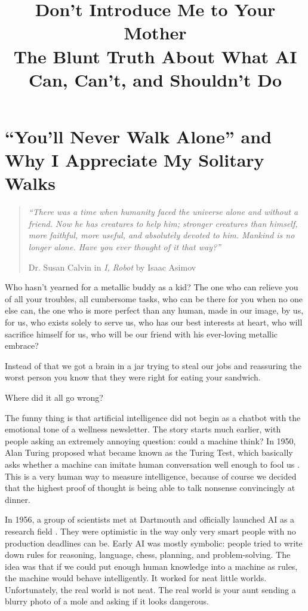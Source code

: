 \documentclass[12pt,oneside]{book}
\title{Don't Introduce Me to Your Mother\\\large The Blunt Truth About What AI Can, Can't, and Shouldn't Do}
\author{}
\date{}
\begin{document}
\hypersetup{pageanchor=false}
\frontmatter
\maketitle
\clearpage
\hypersetup{pageanchor=true}
\tableofcontents

\mainmatter

\chapter{``You'll Never Walk Alone'' and Why I Appreciate My Solitary Walks}

\begin{quote}
\itshape
``There was a time when humanity faced the universe alone and without a friend. Now he has creatures to help him; stronger creatures than himself, more faithful, more useful, and absolutely devoted to him. Mankind is no longer alone. Have you ever thought of it that way?''

\normalfont Dr. Susan Calvin in \emph{I, Robot} by Isaac Asimov \parencite{asimov1950}
\end{quote}

Who hasn't yearned for a metallic buddy as a kid? The one who can relieve you of all your troubles, all cumbersome tasks, who can be there for you when no one else can, the one who is more perfect than any human, made in our image, by us, for us, who exists solely to serve us, who has our best interests at heart, who will sacrifice himself for us, who will be our friend with his ever-loving metallic embrace?

Instead of that we got a brain in a jar trying to steal our jobs and reassuring the worst person you know that they were right for eating your sandwich.

Where did it all go wrong?

The funny thing is that artificial intelligence did not begin as a chatbot with the emotional tone of a wellness newsletter. The story starts much earlier, with people asking an extremely annoying question: could a machine think? In 1950, Alan Turing proposed what became known as the Turing Test, which basically asks whether a machine can imitate human conversation well enough to fool us \parencite{turing1950}. This is a very human way to measure intelligence, because of course we decided that the highest proof of thought is being able to talk nonsense convincingly at dinner.

In 1956, a group of scientists met at Dartmouth and officially launched AI as a research field \parencite{mccarthy1955}. They were optimistic in the way only very smart people with no production deadlines can be. Early AI was mostly symbolic: people tried to write down rules for reasoning, language, chess, planning, and problem-solving. The idea was that if we could put enough human knowledge into a machine as rules, the machine would behave intelligently. It worked for neat little worlds. Unfortunately, the real world is not neat. The real world is your aunt sending a blurry photo of a mole and asking if it looks dangerous.
\end{document}
